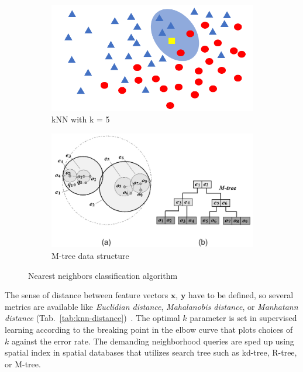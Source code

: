 \begin{figure}[ht]
    \centering
    \begin{subfigure}[b]{0.49\textwidth}
        \includegraphics[width=\textwidth]{assets/analysis/kNN.png}
        \caption{kNN with k = 5}
        \label{fig:knn}
    \end{subfigure}
    \hfill
    \begin{subfigure}[b]{0.49\textwidth}
        \includegraphics[width=\textwidth]{assets/analysis/M-tree.png}
        \caption{M-tree data structure}
        \label{fig:m-tree}
    \end{subfigure}
    \caption{Nearest neighbors classification algorithm~\cite{chen_skyline_2009}}
\end{figure}

The sense of distance between feature vectors $\mathbf{x}$, $\mathbf{y}$ have to be defined, so several metrics are available like \emph{Euclidian distance}, \emph{Mahalanobis distance}, or \emph{Manhatann distance} (Tab.~\ref{tab:knn-distance})~\cite{sheng_review_2020}. The optimal $k$ parameter is set in supervised learning according to the breaking point in the elbow curve that plots choices of $k$ against the error rate. The demanding neighborhood queries are sped up using spatial index in spatial databases that utilizes search tree such as kd-tree, R-tree, or M-tree. 

